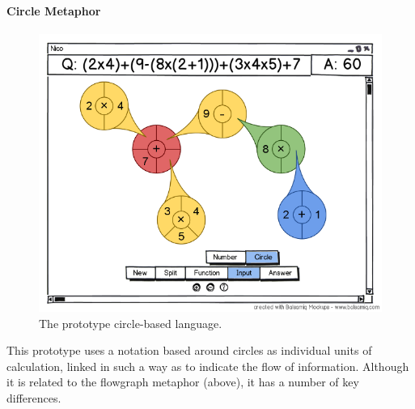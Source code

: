 \documentclass[12pt,twoside,notitlepage,xetex]{report}
\begin{document}

\paragraph{Circle Metaphor}\hfill

\begin{figure}[H]
\begin{center}
\includegraphics[width=\textwidth]{figs/mockups/circles/nico_circmock.png}
\caption{The prototype circle-based language.}
\label{fig:ProtoCirc}
\end{center}
\end{figure}

This prototype uses a notation based around circles as individual units of
calculation, linked in such a way as to indicate the flow of information.
Although it is related to the flowgraph metaphor (above), it has a number of
key differences.
\end{document}
